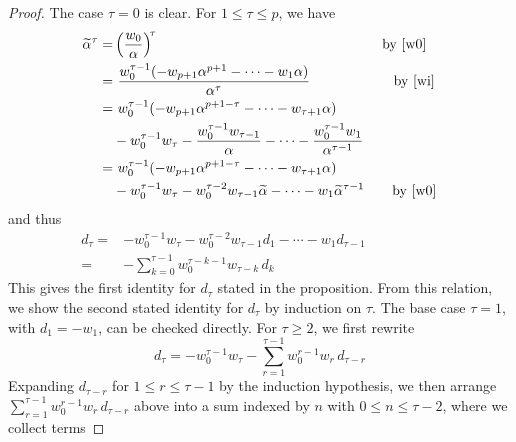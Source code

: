 \documentclass{gtpart}
\theoremstyle{definition}
\theoremstyle{remark}
\newcommand{\A}{\alpha}
\newcommand{\T}{\tau}
\renewcommand{\=}{\approx}
\renewcommand{\-}{\sim}
\numberwithin{equation}{section}
\begin{document}
\begin{proof}
 The case $\T = 0$ is clear.  For $1 \leq \T \leq p$, we have 
 \begin{equation*}
  \begin{split}
   \widetilde{\A}^\T = & \left( \frac{w_0}{\A} \right)^{\!\T} 
                         \qquad\qquad\qquad\qquad\qquad\qquad\qquad\qquad 
                         \text{by \eqref{w0}} \\
                     = & ~ \frac{w_0^{\T - 1} (-w_{p + 1} \A^{p + 1} - \cdots 
                         - w_1 \A)}{\A^\T} 
                         \qquad\qquad\quad~~~ \text{by \eqref{wi}} \\
                     = & ~ w_0^{\T - 1} (-w_{p + 1} \A^{p + 1 - \T} 
                         - \cdots - w_{\T + 1} \A) \\
                       & - w_0^{\T - 1} w_\T 
                         - \frac{w_0^{\T - 1} w_{\T - 1}}{\A} - \cdots 
                         - \frac{w_0^{\T - 1} w_1}{\A^{\T - 1}} \\
                     = & ~ w_0^{\T - 1} (-w_{p + 1} \A^{p + 1 - \T} 
                         - \cdots - w_{\T + 1} \A) \\
                       & - w_0^{\T - 1} w_\T 
                         - w_0^{\T - 2} w_{\T - 1} \widetilde{\A} - \cdots 
                         - w_1 \widetilde{\A}^{\T - 1} 
                         \quad~~~ \text{by \eqref{w0}} 
  \end{split}
 \end{equation*}
 and thus 
 \begin{equation*}
  \begin{split}
   d_\T = & -w_0^{\T - 1} w_\T - w_0^{\T - 2} w_{\T - 1} d_1 - \cdots 
            - w_1 d_{\T - 1} \qquad\qquad\quad~ \\
        = & -\sum_{k = 0}^{\T - 1} w_0^{\T - k - 1} w_{\T - k} \, d_k 
  \end{split}
 \end{equation*}
 This gives the first identity for $d_\T$ stated in the proposition.  From this 
 relation, we show the second stated identity for $d_\T$ by induction on $\T$.  
 The base case $\T = 1$, with $d_1 = -w_1$, can be checked directly.  For 
 $\T \geq 2$, we first rewrite 
 \[
  d_\T = -w_0^{\T - 1} w_\T - \sum_{r = 1}^{\T - 1} 
  w_0^{r - 1} w_r \, d_{\T - r} 
 \]
 Expanding $d_{\T - r}$ for $1 \leq r \leq \T - 1$ by the induction hypothesis, 
 we then arrange $\sum_{r = 1}^{\T - 1} w_0^{r - 1} w_r \, d_{\T - r}$ above 
 into a sum indexed by $n$ with $0 \leq n \leq \T - 2$, where we collect terms 

\end{proof}
\end{document}
